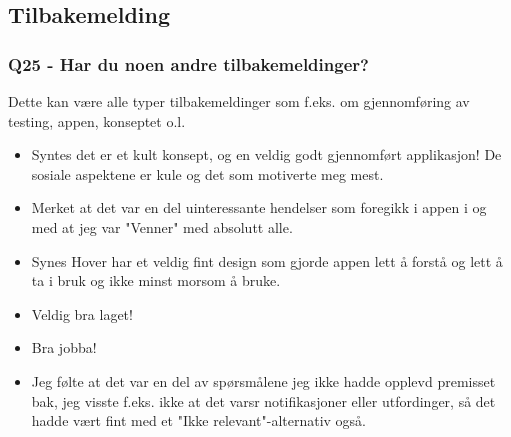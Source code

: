 \newpage
\subsection*{Tilbakemelding}
\subsubsection*{Q25 - Har du noen andre tilbakemeldinger?}

Dette kan være alle typer tilbakemeldinger som f.eks. om gjennomføring av testing, appen, konseptet o.l.

\begin{itemize}[noitemsep]
	\item Syntes det er et kult konsept, og en veldig godt gjennomført applikasjon! De sosiale aspektene er kule og det som motiverte meg mest.
	\item Merket at det var en del uinteressante hendelser som foregikk i appen i og med at jeg var "Venner" med absolutt alle.
	\item Synes Hover har et veldig fint design som gjorde appen lett å forstå og lett å ta i bruk og ikke minst morsom å bruke.
	\item Veldig bra laget!
	\item Bra jobba!
	\item Jeg følte at det var en del av spørsmålene jeg ikke hadde opplevd premisset bak, jeg visste f.eks. ikke at det varsr notifikasjoner eller utfordinger, så det hadde vært fint med et "Ikke relevant"-alternativ også.
\end{itemize}

